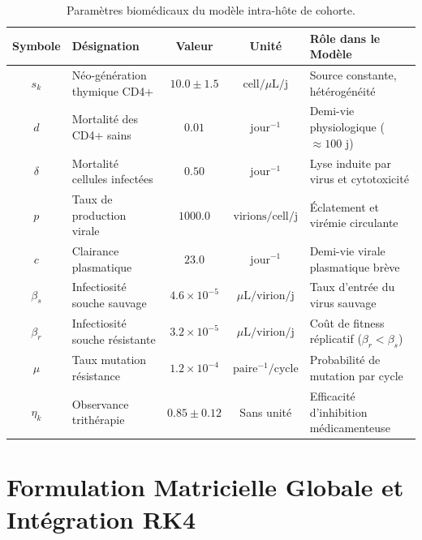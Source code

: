 \documentclass[11pt,a4paper]{report}
\theoremstyle{plain}
\theoremstyle{definition}
\theoremstyle{remark}
\begin{document}
\begin{table}[htbp]
\centering
\caption{Paramètres biomédicaux du modèle intra-hôte de cohorte.}
\label{tab:biomed_params}
\small
\begin{tabularx}{\textwidth}{c >{\raggedright\arraybackslash}p{3.8cm} c c X}
\toprule
\textbf{Symbole} & \textbf{Désignation} & \textbf{Valeur} & \textbf{Unité} & \textbf{Rôle dans le Modèle} \\
\midrule
$s_k$ & Néo-génération thymique CD4+ & $10.0 \pm 1.5$ & $\text{cell}/\mu\text{L}/\text{j}$ & Source constante, hétérogénéité \\
$d$ & Mortalité des CD4+ sains & $0.01$ & $\text{jour}^{-1}$ & Demi-vie physiologique ($\approx 100\text{ j}$) \\
$\delta$ & Mortalité cellules infectées & $0.50$ & $\text{jour}^{-1}$ & Lyse induite par virus et cytotoxicité \\
$p$ & Taux de production virale & $1000.0$ & $\text{virions}/\text{cell}/\text{j}$ & Éclatement et virémie circulante \\
$c$ & Clairance plasmatique & $23.0$ & $\text{jour}^{-1}$ & Demi-vie virale plasmatique brève \\
$\beta_s$ & Infectiosité souche sauvage & $4.6 \times 10^{-5}$ & $\mu\text{L}/\text{virion}/\text{j}$ & Taux d'entrée du virus sauvage \\
$\beta_r$ & Infectiosité souche résistante & $3.2 \times 10^{-5}$ & $\mu\text{L}/\text{virion}/\text{j}$ & Coût de fitness réplicatif ($\beta_r < \beta_s$) \\
$\mu$ & Taux mutation résistance & $1.2 \times 10^{-4}$ & $\text{paire}^{-1}/\text{cycle}$ & Probabilité de mutation par cycle \\
$\eta_k$ & Observance trithérapie & $0.85 \pm 0.12$ & Sans unité & Efficacité d'inhibition médicamenteuse \\
\bottomrule
\end{tabularx}
\end{table}

\chapter{Formulation Matricielle Globale et Intégration RK4}
\end{document}
